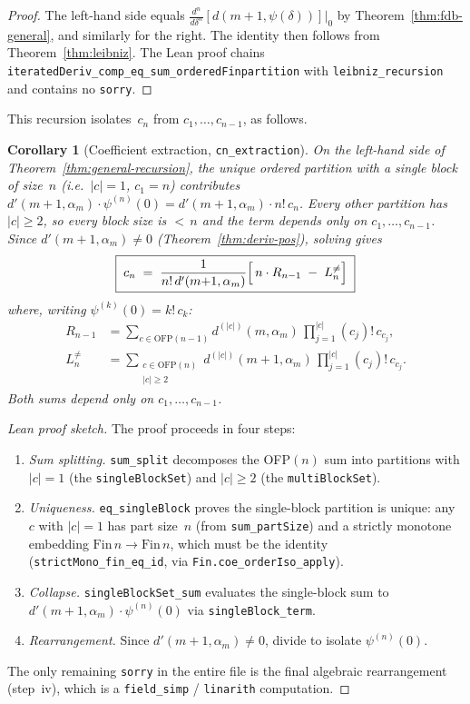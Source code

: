 \documentclass[11pt,a4paper]{article}
\theoremstyle{plain}
\newtheorem{corollary}[theorem]{Corollary}
\theoremstyle{definition}
\newcommand{\alpham}{\alpha_m}
\newcommand{\lean}[1]{\texttt{#1}}
\begin{document}
\begin{proof}
The left-hand side equals
$\frac{d^n}{d\delta^n}[d(m{+}1, \psi(\delta))]|_0$
by Theorem~\ref{thm:fdb-general}, and similarly for the right.
The identity then follows from Theorem~\ref{thm:leibniz}.
The Lean proof chains \lean{iteratedDeriv\_comp\_eq\_sum\_orderedFinpartition}
with \lean{leibniz\_recursion} and contains no \texttt{sorry}.
\end{proof}

This recursion isolates~$c_n$ from $c_1, \ldots, c_{n-1}$, as follows.

\begin{corollary}[Coefficient extraction, \lean{cn\_extraction}]
\label{cor:cn-extraction}
On the left-hand side of Theorem~\ref{thm:general-recursion}, the unique
ordered partition with a single block of size~$n$ (i.e.\ $|c| = 1$,
$c_1 = n$) contributes
$d'(m{+}1,\alpham) \cdot \psi^{(n)}(0) = d'(m{+}1,\alpham) \cdot n!\, c_n$.
Every other partition has $|c| \ge 2$, so every block size is ${<}\,n$
and the term depends only on $c_1, \ldots, c_{n-1}$.
Since $d'(m{+}1,\alpham) \ne 0$
(Theorem~\ref{thm:deriv-pos}), solving gives
\[
  \boxed{\;c_n \;=\; \frac{1}{n!\,d'(m{+}1,\alpham)}
  \Bigl[\,
    n \cdot R_{n-1}
    \;-\; L_n^{\ne}
  \Bigr]\;}
\]
where, writing $\psi^{(k)}(0) = k!\,c_k$:
\begin{align*}
  R_{n-1} &= \sum_{c \in \mathrm{OFP}(n{-}1)}
    d^{(|c|)}(m,\alpham)\,\prod_{j=1}^{|c|} (c_j)!\,c_{c_j}, \\
  L_n^{\ne} &= \!\!\sum_{\substack{c \in \mathrm{OFP}(n)\\ |c| \ge 2}}
    d^{(|c|)}(m{+}1,\alpham)\,\prod_{j=1}^{|c|} (c_j)!\,c_{c_j}.
\end{align*}
Both sums depend only on $c_1, \ldots, c_{n-1}$.
\end{corollary}

\begin{proof}[Lean proof sketch]
The proof proceeds in four steps:
\begin{enumerate}[label=(\roman*),nosep]
\item \emph{Sum splitting.}
  \lean{sum\_split} decomposes the OFP$(n)$ sum into
  partitions with $|c| = 1$ (the \lean{singleBlockSet}) and
  $|c| \ge 2$ (the \lean{multiBlockSet}).
\item \emph{Uniqueness.}
  \lean{eq\_singleBlock} proves the single-block partition is unique:
  any $c$ with $|c| = 1$ has part size~$n$ (from \lean{sum\_partSize})
  and a strictly monotone embedding $\mathrm{Fin}\,n \to \mathrm{Fin}\,n$,
  which must be the identity (\lean{strictMono\_fin\_eq\_id},
  via \lean{Fin.coe\_orderIso\_apply}).
\item \emph{Collapse.}
  \lean{singleBlockSet\_sum} evaluates the single-block sum to
  $d'(m{+}1,\alpham) \cdot \psi^{(n)}(0)$
  via \lean{singleBlock\_term}.
\item \emph{Rearrangement.}
  Since $d'(m{+}1,\alpham) \ne 0$, divide to isolate $\psi^{(n)}(0)$.
\end{enumerate}
The only remaining \texttt{sorry} in the entire file is the
final algebraic rearrangement (step~iv), which is a
\lean{field\_simp} / \lean{linarith} computation.
\end{proof}
\end{document}
